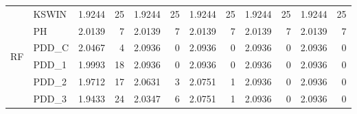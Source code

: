 \begin{table}[h]
{\begin{tabular}{llcrcrcrcrcr}
        \multirow{6}{*}{RF} & KSWIN & 1.9244 & 25 & 1.9244 & 25 & 1.9244 & 25 & 1.9244 & 25 & 1.9244 & 25 \\
         & PH & 2.0139 & 7 & 2.0139 & 7 & 2.0139 & 7 & 2.0139 & 7 & 2.0139 & 7 \\
         & PDD\_C & 2.0467 & 4 & 2.0936 & 0 & 2.0936 & 0 & 2.0936 & 0 & 2.0936 & 0 \\
         & PDD\_1 & 1.9993 & 18 & 2.0936 & 0 & 2.0936 & 0 & 2.0936 & 0 & 2.0936 & 0 \\
         & PDD\_2 & 1.9712 & 17 & 2.0631 & 3 & 2.0751 & 1 & 2.0936 & 0 & 2.0936 & 0 \\
         & PDD\_3 & 1.9433 & 24 & 2.0347 & 6 & 2.0751 & 1 & 2.0936 & 0 & 2.0936 & 0 \\\bottomrule
    \end{tabular}}
\end{table}

